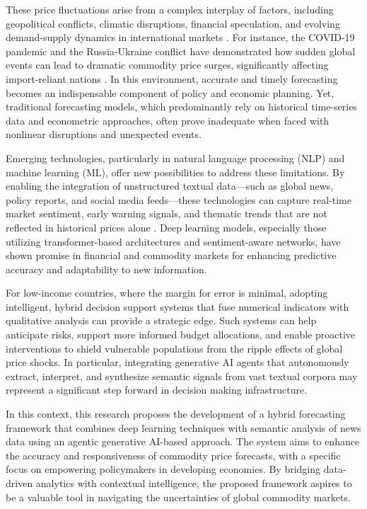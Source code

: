 \documentclass[12pt]{elsarticle}
\begin{document}
These price fluctuations arise from a complex interplay of factors, including geopolitical conflicts, climatic disruptions, financial speculation, and evolving demand-supply dynamics in international markets \cite{abbott2011s}. For instance, the COVID-19 pandemic and the Russia-Ukraine conflict have demonstrated how sudden global events can lead to dramatic commodity price surges, significantly affecting import-reliant nations \cite{mamun2024role}. In this environment, accurate and timely forecasting becomes an indispensable component of policy and economic planning. Yet, traditional forecasting models, which predominantly rely on historical time-series data  \cite{ghoshray2014breaks} and econometric approaches, often prove inadequate when faced with nonlinear disruptions and unexpected events.

Emerging technologies, particularly in natural language processing (NLP) and machine learning (ML), offer new possibilities to address these limitations. By enabling the integration of unstructured textual data—such as global news, policy reports, and social media feeds—these technologies can capture real-time market sentiment, early warning signals, and thematic trends that are not reflected in historical prices alone \cite{zhang2022exploring}. Deep learning models, especially those utilizing transformer-based architectures and sentiment-aware networks, have shown promise in financial and commodity markets \cite{kaur2023trade} for enhancing predictive accuracy and adaptability to new information.

For low-income countries, where the margin for error is minimal, adopting intelligent, hybrid decision support systems that fuse numerical indicators with qualitative analysis can provide a strategic edge. Such systems can help anticipate risks, support more informed budget allocations, and enable proactive interventions to shield vulnerable populations from the ripple effects of global price shocks. In particular, integrating generative AI agents that autonomously extract, interpret, and synthesize semantic signals from vast textual corpora may represent a significant step forward in decision making infrastructure.

In this context, this research proposes the development of a hybrid forecasting framework that combines deep learning techniques with semantic analysis of news data using an agentic generative AI-based approach. The system aims to enhance the accuracy and responsiveness of commodity price forecasts, with a specific focus on empowering policymakers in developing economies. By bridging data-driven analytics with contextual intelligence, the proposed framework aspires to be a valuable tool in navigating the uncertainties of global commodity markets.
\end{document}
